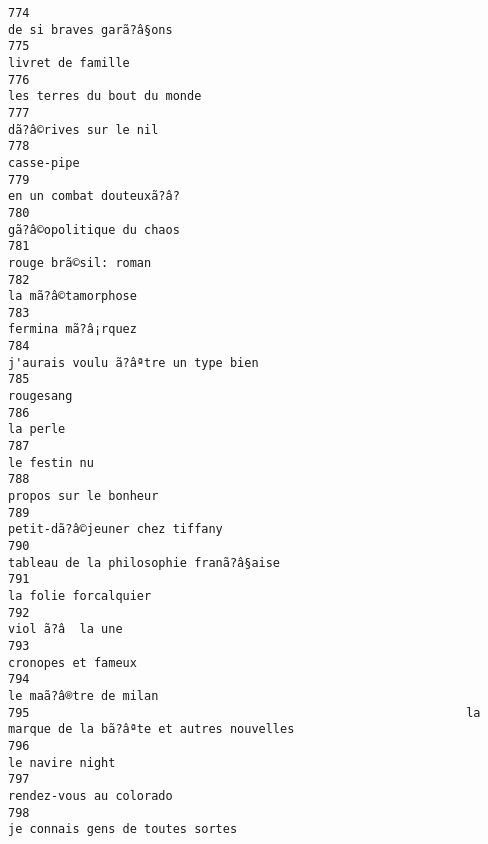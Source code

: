 \documentclass[
]{report}
\begin{document}
\begin{verbatim}
774                                                                                 de si braves garã?â§ons
775                                                                                       livret de famille
776                                                                             les terres du bout du monde
777                                                                                   dã?â©rives sur le nil
778                                                                                              casse-pipe
779                                                                                en un combat douteuxã?â?
780                                                                                gã?â©opolitique du chaos
781                                                                                    rouge brã©sil: roman
782                                                                                      la mã?â©tamorphose
783                                                                                      fermina mã?â¡rquez
784                                                                     j'aurais voulu ã?âªtre un type bien
785                                                                                               rougesang
786                                                                                                la perle
787                                                                                            le festin nu
788                                                                                   propos sur le bonheur
789                                                                          petit-dã?â©jeuner chez tiffany
790                                                                  tableau de la philosophie franã?â§aise
791                                                                                    la folie forcalquier
792                                                                                        viol ã?â  la une
793                                                                                      cronopes et fameux
794                                                                                   le maã?â®tre de milan
795                                                             la marque de la bã?âªte et autres nouvelles
796                                                                                         le navire night
797                                                                                 rendez-vous au colorado
798                                                                        je connais gens de toutes sortes

\end{verbatim}
\end{document}
